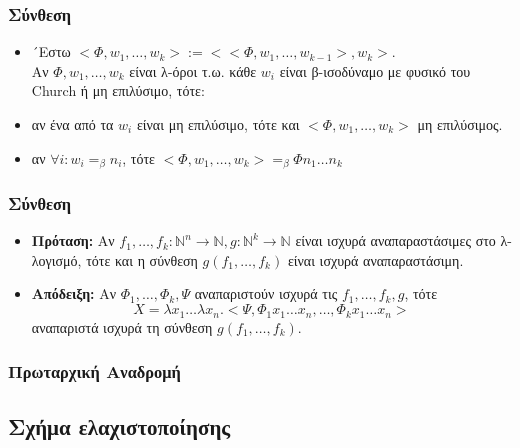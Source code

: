 \documentclass{beamer}
\begin{document}
\begin{frame}
        \frametitle{Σύνθεση}
        \begin{itemize}
                \item ´Εστω $<\Phi, w_1,\ldots, w_k> := <<\Phi, w_1,\ldots, w_{k-1}>, w_k>$. \\
                  Αν $\Phi, w_1,\ldots, w_k$ είναι λ-όροι τ.ω. κάθε $w_i$ είναι β-ισοδύναμο με φυσικό του Church ή μη επιλύσιμο, τότε: \pause
                 \item αν ένα από τα $w_i$ είναι μη επιλύσιμο, τότε και $<\Phi, w_1,\ldots, w_k>$ μη επιλύσιμος. \pause
                 \item αν $\forall i: w_i =_\beta n_i$, τότε $<\Phi, w_1,\ldots, w_k> =_\beta \Phi n_1 \ldots n_k$   
        \end{itemize}
\end{frame}

\begin{frame}
        \frametitle{Σύνθεση}
        \begin{itemize}
                \item \textbf{Πρόταση:} Αν $f_1,\ldots,f_k : \mathbb{N}^n \rightarrow \mathbb{N}, g : \mathbb{N}^k \rightarrow \mathbb{N}$ είναι ισχυρά αναπαραστάσιμες στο λ-λογισμό, τότε και η σύνθεση 
                 $g(f_1,\ldots,f_k)$ είναι ισχυρά αναπαραστάσιμη. \pause
                 \item \textbf{Απόδειξη:} Αν $\Phi_1, \ldots, \Phi_k, \Psi$ αναπαριστούν ισχυρά τις
                  $f_1,\ldots, f_k, g$, τότε
                  \[X = \lambda x_1 \ldots \lambda x_n . <\Psi, \Phi_1 x_1 \ldots x_n, \ldots, \Phi_k x_1 \ldots x_n> \]
                  αναπαριστά ισχυρά τη σύνθεση $g(f_1,\ldots,f_k)$. 
        \end{itemize}
\end{frame}

\subsubsection{Πρωταρχική Αναδρομή}
\subsection{Σχήμα ελαχιστοποίησης}
\end{document}
